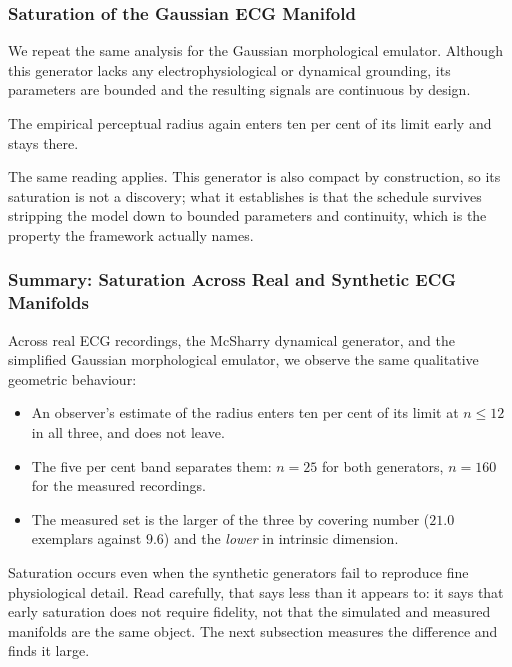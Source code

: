 \documentclass[10pt]{article}
\theoremstyle{plain}
\theoremstyle{definition}
\theoremstyle{remark}
\begin{document}
\subsubsection{Saturation of the Gaussian ECG Manifold}

We repeat the same analysis for the Gaussian morphological emulator. Although
this generator lacks any electrophysiological or dynamical grounding, its
parameters are bounded and the resulting signals are continuous by design.

The empirical perceptual radius again enters ten per cent of its limit early
and stays there.

The same reading applies. This generator is also compact by construction, so
its saturation is not a discovery; what it establishes is that the schedule
survives stripping the model down to bounded parameters and continuity, which
is the property the framework actually names.



\subsubsection{Summary: Saturation Across Real and Synthetic ECG Manifolds}

Across real ECG recordings, the McSharry dynamical generator, and the simplified
Gaussian morphological emulator, we observe the same qualitative geometric
behaviour:
\begin{itemize}
    \item An observer's estimate of the radius enters ten per cent of its limit
    at $n \le 12$ in all three, and does not leave.
    \item The five per cent band separates them: $n=25$ for both generators,
    $n=160$ for the measured recordings.
    \item The measured set is the larger of the three by covering number
    ($21.0$ exemplars against $9.6$) and the \emph{lower} in intrinsic
    dimension.
\end{itemize}

Saturation occurs even when the synthetic generators fail to reproduce fine
physiological detail. Read carefully, that says less than it appears to: it
says that early saturation does not require fidelity, not that the simulated
and measured manifolds are the same object. The next subsection measures the
difference and finds it large.
\end{document}
